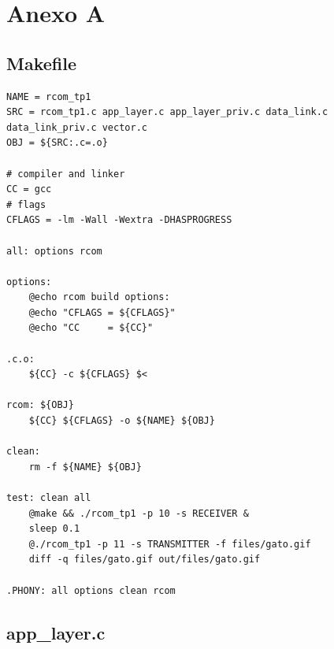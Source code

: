 \documentclass[11pt]{report}
\begin{document}
\chapter*{Anexo A}

\section{Makefile}

\begin{lstlisting}
NAME = rcom_tp1
SRC = rcom_tp1.c app_layer.c app_layer_priv.c data_link.c data_link_priv.c vector.c
OBJ = ${SRC:.c=.o}

# compiler and linker
CC = gcc
# flags
CFLAGS = -lm -Wall -Wextra -DHASPROGRESS

all: options rcom

options:
	@echo rcom build options:
	@echo "CFLAGS = ${CFLAGS}"
	@echo "CC     = ${CC}"

.c.o:
	${CC} -c ${CFLAGS} $<

rcom: ${OBJ}
	${CC} ${CFLAGS} -o ${NAME} ${OBJ}

clean:
	rm -f ${NAME} ${OBJ}

test: clean all
	@make && ./rcom_tp1 -p 10 -s RECEIVER &
	sleep 0.1
	@./rcom_tp1 -p 11 -s TRANSMITTER -f files/gato.gif
	diff -q files/gato.gif out/files/gato.gif

.PHONY: all options clean rcom
\end{lstlisting}

\section{app\_layer.c}
\end{document}

